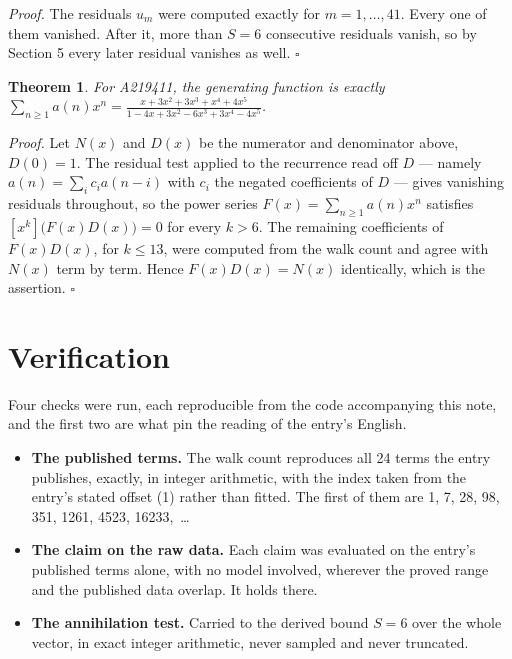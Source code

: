 \documentclass[11pt]{article}
\newtheorem{theorem}{Theorem}
\theoremstyle{definition}
\begin{document}
{\itshape Proof.} The residuals $u_m$ were computed exactly for $m = 1,\dots,41$. Every one of them vanished. After it, more than $S = 6$ consecutive residuals vanish, so by Section 5 every later residual vanishes as well. $\square$

\begin{theorem} For A219411, the generating function is exactly $\sum_{n\ge 1} a(n)x^n = \frac{x + 3x^{2} + 3x^{3} + x^{4} + 4x^{5}}{1 - 4x + 3x^{2} - 6x^{3} + 3x^{4} - 4x^{5}}$.\end{theorem}

{\itshape Proof.} Let $N(x)$ and $D(x)$ be the numerator and denominator above, $D(0)=1$. The residual test applied to the recurrence read off $D$ --- namely $a(n) = \sum_i c_i a(n-i)$ with $c_i$ the negated coefficients of $D$ --- gives vanishing residuals throughout, so the power series $F(x)=\sum_{n\ge 1}a(n)x^n$ satisfies $[x^k]\bigl(F(x)D(x)\bigr) = 0$ for every $k > 6$. The remaining coefficients of $F(x)D(x)$, for $k \le 13$, were computed from the walk count and agree with $N(x)$ term by term. Hence $F(x)D(x) = N(x)$ identically, which is the assertion. $\square$

\section{Verification}

Four checks were run, each reproducible from the code accompanying this note, and the first two are what pin the reading of the entry's English.

\begin{itemize}

\item {\bfseries The published terms.} The walk count reproduces all 24 terms the entry publishes, exactly, in integer arithmetic, with the index taken from the entry's stated offset (1) rather than fitted. The first of them are 1, 7, 28, 98, 351, 1261, 4523, 16233,~\dots

\item {\bfseries The claim on the raw data.} Each claim was evaluated on the entry's published terms alone, with no model involved, wherever the proved range and the published data overlap. It holds there.

\item {\bfseries The annihilation test.} Carried to the derived bound $S = 6$ over the whole vector, in exact integer arithmetic, never sampled and never truncated.

\end{itemize}
\end{document}
